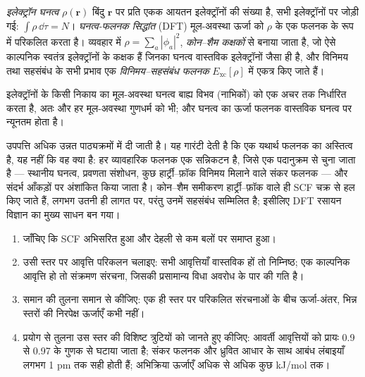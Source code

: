 \begin{definition}\label{def:b3:computational-chemistry:dft}
\emph{इलेक्ट्रॉन घनत्व} $\rho(\mathbf r)$ बिंदु
$\mathbf r$ पर प्रति एकक आयतन इलेक्ट्रॉनों की संख्या है, सभी इलेक्ट्रॉनों पर जोड़ी गई:
$\int\rho\,\dd\tau = N$। \emph{घनत्व-फलनक सिद्धांत}
(DFT) मूल-अवस्था ऊर्जा को $\rho$ के एक फलनक के रूप में परिकलित करता है।
व्यवहार में $\rho = \sum_a|\phi_a|^2$, \emph{कोन--शैम
कक्षकों} से बनाया जाता है, जो ऐसे काल्पनिक स्वतंत्र
इलेक्ट्रॉनों के कक्षक हैं जिनका घनत्व वास्तविक इलेक्ट्रॉनों जैसा ही है, और विनिमय तथा
सहसंबंध के सभी प्रभाव एक \emph{विनिमय--सहसंबंध
फलनक} $E_{\mathrm{xc}}[\rho]$ में एकत्र किए जाते हैं।
\end{definition}

\begin{theorem}[होहेनबर्ग--कोन]\label{thm:b3:computational-chemistry:hohenberg-kohn}
इलेक्ट्रॉनों के किसी निकाय का मूल-अवस्था घनत्व बाह्य
विभव (नाभिकों) को एक अचर तक निर्धारित करता है, अतः  और हर
मूल-अवस्था गुणधर्म को भी; और घनत्व का ऊर्जा फलनक
वास्तविक घनत्व पर न्यूनतम होता है।
\end{theorem}
\admitted

उपपत्ति अधिक उन्नत पाठ्यक्रमों में दी जाती है। यह गारंटी देती है कि एक यथार्थ
फलनक का अस्तित्व है, यह नहीं कि वह क्या है: हर व्यावहारिक फलनक एक
सन्निकटन है, जिसे एक पदानुक्रम से चुना जाता है --- स्थानीय घनत्व, प्रवणता
संशोधन, कुछ हार्ट्री--फ़ॉक विनिमय मिलाने वाले संकर फलनक --- और
संदर्भ आँकड़ों पर अंशांकित किया जाता है। कोन--शैम समीकरण
हार्ट्री--फ़ॉक वाले ही SCF चक्र से हल किए जाते हैं, लगभग उतनी ही लागत पर, परंतु उनमें सहसंबंध सम्मिलित है;
इसीलिए DFT रसायन विज्ञान का मुख्य साधन बन गया।

\begin{method}[किसी परिकलन को पढ़ना]\label{met:b3:computational-chemistry:read-calculation}
\begin{enumerate}
  \item जाँचिए कि SCF अभिसरित हुआ और 
        देहली से कम बलों पर समाप्त हुआ।
  \item उसी स्तर पर आवृत्ति परिकलन चलाइए: सभी आवृत्तियाँ वास्तविक हों तो
        निम्निष्ठ; एक काल्पनिक आवृत्ति हो तो संक्रमण संरचना, जिसकी
        प्रसामान्य विधा अवरोध के पार की गति है।
  \item समान की तुलना समान से कीजिए: एक ही स्तर पर परिकलित संरचनाओं के बीच
        ऊर्जा-अंतर, भिन्न स्तरों की निरपेक्ष ऊर्जाएँ कभी नहीं।
  \item प्रयोग से तुलना उस स्तर की विशिष्ट त्रुटियों को जानते हुए कीजिए:
        आवर्ती आवृत्तियों को प्रायः 0.9 से 0.97 के गुणक से घटाया जाता है;
        संकर फलनक और ध्रुवित आधार के साथ आबंध लंबाइयाँ लगभग 1 pm तक सही होती हैं;
        अभिक्रिया ऊर्जाएँ अधिक से अधिक कुछ \unit{kJ/mol} तक।
\end{enumerate}
\end{method}

